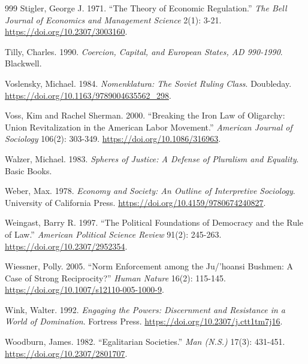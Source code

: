 \documentclass[11pt,letterpaper]{article}
\theoremstyle{definition}
\theoremstyle{remark}
\begin{document}
\begin{small}
\begin{thebibliography}{999}
Stigler, George J. 1971. ``The Theory of Economic Regulation.'' \emph{The Bell Journal of Economics and Management Science} 2(1): 3-21. \url{https://doi.org/10.2307/3003160}.

Tilly, Charles. 1990. \emph{Coercion, Capital, and European States, AD 990-1990}. Blackwell.

Voslensky, Michael. 1984. \emph{Nomenklatura: The Soviet Ruling Class}. Doubleday. \url{https://doi.org/10.1163/9789004635562_298}.

Voss, Kim and Rachel Sherman. 2000. ``Breaking the Iron Law of Oligarchy: Union Revitalization in the American Labor Movement.'' \emph{American Journal of Sociology} 106(2): 303-349. \url{https://doi.org/10.1086/316963}.

Walzer, Michael. 1983. \emph{Spheres of Justice: A Defense of Pluralism and Equality}. Basic Books.

Weber, Max. 1978. \emph{Economy and Society: An Outline of Interpretive Sociology}. University of California Press. \url{https://doi.org/10.4159/9780674240827}.

Weingast, Barry R. 1997. ``The Political Foundations of Democracy and the Rule of Law.'' \emph{American Political Science Review} 91(2): 245-263. \url{https://doi.org/10.2307/2952354}.

Wiessner, Polly. 2005. ``Norm Enforcement among the Ju/'hoansi Bushmen: A Case of Strong Reciprocity?'' \emph{Human Nature} 16(2): 115-145. \url{https://doi.org/10.1007/s12110-005-1000-9}.

Wink, Walter. 1992. \emph{Engaging the Powers: Discernment and Resistance in a World of Domination}. Fortress Press. \url{https://doi.org/10.2307/j.ctt1tm7j16}.

Woodburn, James. 1982. ``Egalitarian Societies.'' \emph{Man (N.S.)} 17(3): 431-451. \url{https://doi.org/10.2307/2801707}.

\end{thebibliography}
\end{small}
\end{document}

